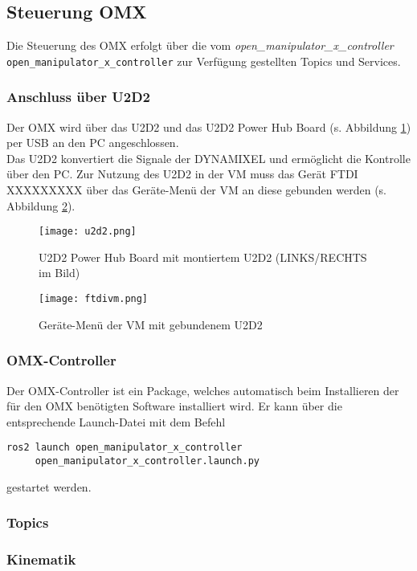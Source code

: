 \subsection{Steuerung OMX}
Die Steuerung des OMX erfolgt über die vom \emph{open\_manipulator\_x\_controller}\\ \verb|open_manipulator_x_controller| zur Verfügung gestellten Topics und Services.
\subsubsection{Anschluss über U2D2}{\label{u2d2}}
Der OMX wird über das U2D2 und das U2D2 Power Hub Board (s. Abbildung \ref{fig:u2d2}) per USB an den PC angeschlossen.\\
Das U2D2 konvertiert die Signale der DYNAMIXEL und ermöglicht die Kontrolle über den PC. Zur Nutzung des U2D2 in der \ac{VM} muss das Gerät FTDI XXXXXXXXX über das Geräte-Menü der \ac{VM} an diese gebunden werden (s. Abbildung \ref{fig:ftdivm}).
\begin{figure}[ht!]
\centering
\texttt{[image: u2d2.png]}
\caption{U2D2 Power Hub Board mit montiertem U2D2 (LINKS/RECHTS im Bild)}
\label{fig:u2d2}
\end{figure}
\begin{figure}[ht!]
\centering
\texttt{[image: ftdivm.png]}
\caption{Geräte-Menü der \ac{VM} mit gebundenem U2D2}
\label{fig:ftdivm}
\end{figure}
\subsubsection{OMX-Controller}
Der OMX-Controller ist ein Package, welches automatisch beim Installieren der für den OMX benötigten Software installiert wird. Er kann über die entsprechende Launch-Datei mit dem Befehl
\begin{verbatim}
ros2 launch open_manipulator_x_controller 
     open_manipulator_x_controller.launch.py
\end{verbatim}
gestartet werden.
\subsubsection{Topics}
\subsubsection{Kinematik}
